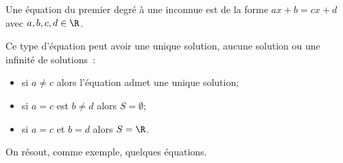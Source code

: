 \documentclass[a4paper,12pt]{report}
\begin{document}
Une équation du premier degré à une inconnue est de la forme $ax+b=cx+d$ avec $a,b,c,d\in \R$.
\begin{boiteExT}
\vspace{7cm}

\end{boiteExT}
Ce type d'équation peut avoir une unique solution, aucune solution ou une infinité de solutions~:
\begin{itemize}
	\item[] si $a\neq c$ alors l'équation admet une unique solution;
	\item[] si $a=c$ est $b\neq d$ alors $S=\emptyset$;
	\item[] si $a=c$ et $b=d$ alors $S=\R$.
\end{itemize}
\begin{boiteExT}
\vspace{10cm}

\end{boiteExT}
\newpage
On résout, comme exemple, quelques équations.
\begin{boiteExT}
\vspace{10cm}

\end{boiteExT}
\begin{boiteExT}
\vspace{10cm}

\end{boiteExT}
\end{document}
